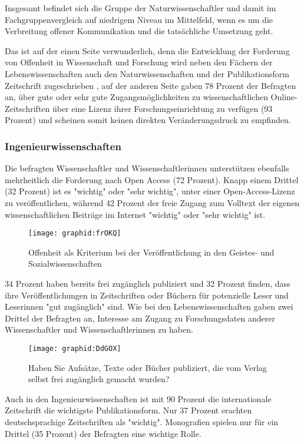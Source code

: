 Insgesamt befindet sich die Gruppe der Naturwissenschaftler und damit im Fachgruppenvergleich auf niedrigem Niveau im Mittelfeld, wenn es um die Verbreitung offener Kommunikation und die tatsächliche Umsetzung geht.

Das ist auf der einen Seite verwunderlich, denn die Entwicklung der Forderung von Offenheit in Wissenschaft und Forschung wird neben den Fächern der Lebenswissenschaften auch den Naturwissenschaften und der Publikationsform Zeitschrift zugeschrieben \cite{naeder_2010_open}, auf der anderen Seite gaben 78 Prozent der Befragten an, über gute oder sehr gute Zugangsmöglichkeiten zu wissenschaftlichen Online-Zeitschriften über eine Lizenz ihrer Forschungseinrichtung zu verfügen (93 Prozent) und scheinen somit keinen direkten Veränderungsdruck zu empfinden.

\subsubsection{Ingenieurwissenschaften}

Die befragten Wissenschaftler und Wissenschaftlerinnen unterstützen ebenfalls mehrheitlich die Forderung nach Open Access (72 Prozent). Knapp einem Drittel (32 Prozent) ist es "wichtig" oder "sehr wichtig", unter einer Open-Access-Lizenz zu veröffentlichen, während 42 Prozent der freie Zugang zum Volltext der eigenen wissenschaftlichen Beiträge im Internet "wichtig" oder "sehr wichtig" ist.

\begin{figure}[h!]
\texttt{[image: graphid:frOKQ]}
\caption{Offenheit als Kriterium bei der Veröffentlichung in den Geistes- und Sozialwissenschaften}
\end{figure}

34 Prozent haben bereits frei zugänglich publiziert und 32 Prozent finden, dass ihre Veröffentlichungen in Zeitschriften oder Büchern für potenzielle Leser und Leserinnen "gut zugänglich" sind. Wie bei den Lebenswissenschaften gaben zwei Drittel der Befragten an, Interesse am Zugang zu Forschungsdaten anderer Wissenschaftler und Wissenschaftlerinnen zu haben.

\begin{figure}[h!]
\texttt{[image: graphid:DdGOX]}
\caption{Haben Sie Aufsätze, Texte oder Bücher publiziert, die vom Verlag selbst frei zugänglich gemacht wurden?}
\end{figure}

Auch in den Ingenieurwissenschaften ist mit 90 Prozent die internationale Zeitschrift die wichtigste Publikationsform. Nur 37 Prozent erachten deutschsprachige Zeitschriften als "wichtig". Monografien spielen nur für ein Drittel (35 Prozent) der Befragten eine wichtige Rolle.
